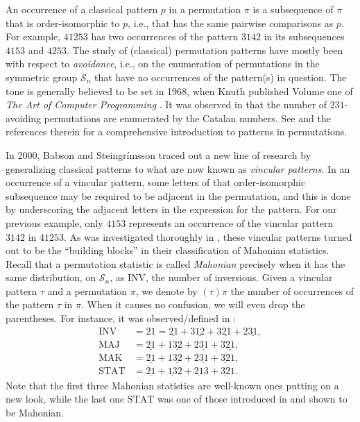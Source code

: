 \documentclass[12pt]{amsart}
\numberwithin{equation}{section}
\theoremstyle{plain}
\theoremstyle{definition}
\def\INV{\mathrm{INV}}
\def\MAJ{\mathrm{MAJ}}
\def\MAK{\mathrm{MAK}}
\def\STAT{\mathrm{STAT}}
\def\SS{\mathcal{S}}
\begin{document}
An occurrence of a classical pattern $p$ in a permutation $\pi$ is a subsequence of $\pi$ that is order-isomorphic to $p$, i.e., that has the same pairwise comparisons as $p$. For example, $41253$ has two occurrences of the pattern $3142$ in its subsequences $4153$ and $4253$. The study of (classical) permutation patterns have mostly been with respect to \emph{avoidance}, i.e., on the enumeration of permutations in the symmetric group $\SS_n$ that have no occurrences of the pattern(s) in question. The tone is generally believed to be set in 1968, when Knuth published Volume one of \emph{The Art of Computer Programming} \cite{Knu}. It was observed in \cite{Knu} that the number of $231$-avoiding permutations are enumerated by the Catalan numbers. See \cite{Kit} and the references therein for a comprehensive introduction to patterns in permutations.

In 2000, Babson and Steingr\'{i}msson \cite{BS} traced out a new line of research by generalizing classical patterns to what are now known as \emph{vincular patterns}. In an occurrence of a vincular pattern, some letters of that order-isomorphic subsequence may be required to be adjacent in the permutation, and this is done by underscoring the adjacent letters in the expression for the pattern. For our previous example, only $4153$ represents an occurrence of the vincular pattern $\underline{31}42$ in $41253$. As was investigated thoroughly in \cite{BS}, these vincular patterns turned out to be the ``building blocks'' in their classification of Mahonian statistics. Recall that a permutation statistic is called \emph{Mahonian} precisely when it has the same distribution, on $\SS_n$, as $\INV$, the number of inversions. Given a vincular pattern $\tau$ and a permutation $\pi$, we denote by $(\tau)\pi$ the number of occurrences of the pattern $\tau$ in $\pi$. When it causes no confusion, we will even drop the parentheses. For instance, it was observed/defined in \cite{BS}:
\begin{align}
\INV &=21=\underline{21}+3\underline{12}+3\underline{21}+2\underline{31},\nonumber\\
\MAJ &=\underline{21}+1\underline{32}+2\underline{31}+3\underline{21},\nonumber\\
\MAK &=\underline{21}+1\underline{32}+2\underline{31}+\underline{32}1,\nonumber\\
\STAT &=\underline{21}+\underline{13}2+\underline{21}3+\underline{32}1.
\end{align}
Note that the first three Mahonian statistics are well-known ones putting on a new look, while the last one $\STAT$ was one of those introduced in \cite{BS} and shown to be Mahonian.
\end{document}
